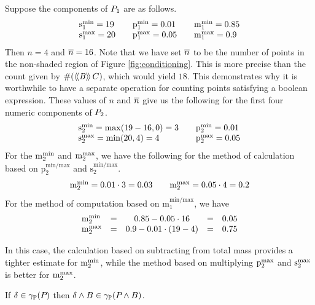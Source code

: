 Suppose the components of $P_{1}$ are as follows.
\[
\begin{array}{l@{\qquad}l@{\qquad}l}
\smin{1} = 19 & \pmin{1} = 0.01 & \mmin{1} = 0.85 \\
\smax{1} = 20 & \pmax{1} = 0.05 & \mmax{1} = 0.9
\end{array}
\]
Then $n = 4$ and $\overline{n} = 16$.  Note that we have set $\overline{n}$ to be the
number of points in the non-shaded region of Figure \ref{fig:conditioning}.
This is more precise than the count given by $\#(\langle\!\langle{\mathit{B}}\rangle\!\rangle\,{C})$, which
would yield $18$.  This demonstrates why it is worthwhile to have a
separate operation for counting points satisfying a boolean expression.
These values of $n$ and $\overline{n}$ give us the following for
the first four numeric components of $P_{2}$.
\[
\begin{array}{l@{\qquad}l}
\smin{2} = \max(19 - 16, 0) = 3 & \pmin{2} = 0.01 \\
\smax{2} = \min(20,4) = 4 & \pmax{2} = 0.05
\end{array}
\]
For the $\mathrm{m}^\mathrm{min}_{2}$ and $\mathrm{m}^\mathrm{max}_{2}$, we have the following for the
method of calculation based on $\mathrm{p^{min/max}_2}$ and
$\mathrm{s^{min/max}_2}$.
\[
\begin{array}{l@{\qquad}l}
\mmin{2} = 0.01 \cdot 3 = 0.03  & \mmax{2} = 0.05 \cdot 4 = 0.2
\end{array}
\]
For the method of computation based on $\mathrm{m^{min/max}_1}$, we have
\[
\begin{array}{llcrr}
\mathrm{m}^\mathrm{min}_{2} &= &0.85 - 0.05 \cdot 16& =& 0.05\\
 \mathrm{m}^\mathrm{max}_{2} &= &0.9 - 0.01 \cdot (19-4)& =& 0.75
\end{array}
\]

In this case, the calculation based on subtracting from total mass
provides a tighter estimate for $\mathrm{m}^\mathrm{min}_{2}$, while the method based on
multiplying $\mathrm{p}^\mathrm{max}_{2}$ and $\mathrm{s}^\mathrm{max}_{2}$ is better for
$\mathrm{m}^\mathrm{max}_{2}$.

\begin{lemma} \label{lem:pp:cond} If $ \delta \in \gamma_{\mathbb{P}}(P_{}) $ then $
  \delta \wedge B \in \gamma_{\mathbb{P}}(P_{} \wedge B) $.
\end{lemma}




